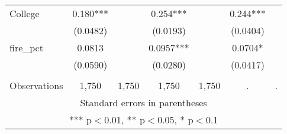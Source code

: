\begin{tabular}{lcccccc}
College & 0.180*** &  & 0.254*** &  & 0.244*** &  \\
 & (0.0482) &  & (0.0193) &  & (0.0404) &  \\
fire\_pct & 0.0813 &  & 0.0957*** &  & 0.0704* &  \\
 & (0.0590) &  & (0.0280) &  & (0.0417) &  \\
 &  &  &  &  &  &  \\
 Observations & 1,750 & 1,750 & 1,750 & 1,750 & . & . \\ \hline
\multicolumn{7}{c}{ Standard errors in parentheses} \\
\multicolumn{7}{c}{ *** p$<$0.01, ** p$<$0.05, * p$<$0.1} \\
\end{tabular}
